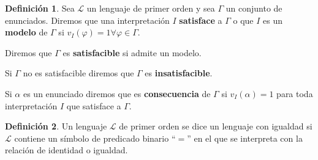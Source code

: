 \documentclass[a4paper,11pt]{article}
\theoremstyle{definition}
\newtheorem{defn}{Definición}[section]
\theoremstyle{remark}
\def\LL{\ensuremath{\mathcal{L}}}
\begin{document}
\begin{defn}
    Sea $\LL$ un lenguaje de primer orden y sea $\Gamma$ un conjunto de
    enunciados. Diremos que una interpretación $I$ \textbf{satisface}
    a $\Gamma$ o que $I$ es un \textbf{modelo} de $\Gamma$ si
    $v_I(\varphi) = 1 \forall \varphi \in \Gamma$.
    
    Diremos que $\Gamma$ es \textbf{satisfacible} si admite un modelo.
    
    Si $\Gamma$ no es satisfacible diremos que $\Gamma$ es
    \textbf{insatisfacible}.
    
    Si $\alpha$ es un enunciado diremos que es \textbf{consecuencia} de $\Gamma$
    si $v_I(\alpha) = 1$ para toda interpretación $I$ que satisface a $\Gamma$.
\end{defn}

\begin{defn}
    Un lenguaje $\LL$ de primer orden se dice un lenguaje con igualdad
    si $\LL$ contiene un símbolo de predicado binario ``$=$'' en el que
    se interpreta con la relación de identidad o igualdad.
\end{defn}
\end{document}
